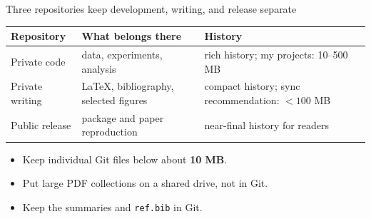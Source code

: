 \begin{frame}{Three repositories keep development, writing, and release separate}
  \vfill
  \begin{center}\small
  \renewcommand{\arraystretch}{1.22}
  \begin{tabular}{@{}>{\raggedright\arraybackslash}p{3.1cm}>{\raggedright\arraybackslash}p{5.1cm}>{\raggedright\arraybackslash}p{4.3cm}@{}}
    \toprule
    \textbf{Repository} & \textbf{What belongs there} & \textbf{History} \\
    \midrule
    Private code & data, experiments, analysis & rich history; my projects: 10--500 MB \\
    Private writing & \LaTeX{}, bibliography, selected figures & compact history; sync recommendation: $<100$ MB \\
    Public release & package and paper reproduction & near-final history for readers \\
    \bottomrule
  \end{tabular}
  \end{center}
  \vspace{0.7em}
  \begin{itemize}\small\setlength\itemsep{0.4em}
    \item Keep individual Git files below about \textbf{10 MB}.
    \item Put large PDF collections on a shared drive, not in Git.
    \item Keep the summaries and \texttt{ref.bib} in Git.
  \end{itemize}
  \vspace{1.0cm plus 1fill}
\end{frame}

